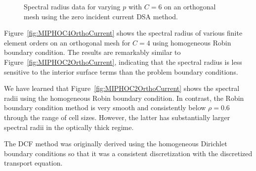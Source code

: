\documentclass[12pt]{article}
\begin{document}
\begin{figure}[!hbt]
\centering
{}
\caption{Spectral radius data for varying $p$ with $C=6$ on an orthogonal mesh using the zero incident current DSA method.}
\label{fig:MIPHOC6OrthoCurrent}
\end{figure}

Figure~\ref{fig:MIPHOC4OrthoCurrent} shows the spectral radius of various finite element orders on an orthogonal mesh for $C=4$ using homogeneous Robin boundary condition. The results are remarkably similar to Figure~\ref{fig:MIPHOC2OrthoCurrent}, indicating that the spectral radius is less sensitive to the interior surface terms than the problem boundary conditions.

We have learned that 
Figure~\ref{fig:MIPHOC2OrthoCurrent} shows the spectral radii using the homogeneous Robin boundary condition. In contrast, the Robin boundary condition method is very smooth and consistently below $\rho = 0.6$ through the range of cell sizes. However, the latter has substantially larger spectral radii in the optically thick regime.

The DCF method was originally derived using the homogeneous Dirichlet boundary conditions so that it was a consistent discretization with the discretized transport equation.
\end{document}
